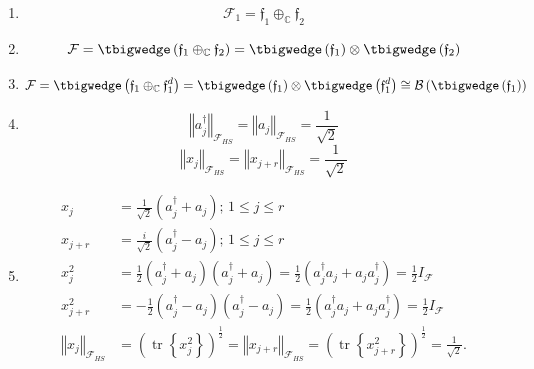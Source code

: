 \documentclass[aps, preprint]{revtex4}
\begin{document}
\begin{enumerate}
\item
\begin{equation}\mathcal{F}_{1} =\mathfrak{f}_{1}  \oplus _{\mathbb{C}}\mathfrak{f}_{2}
\end{equation}

\item
\begin{equation}\mathcal{F} = \tbigwedge \left (\mathfrak{f}_{1}  \oplus _{\mathbb{C}}\mathfrak{f}_{2}\right ) = \tbigwedge \left (\mathfrak{f}_{1}\right ) \otimes  \tbigwedge  \left (\mathfrak{f}_{2}\right )
\end{equation}

\item
\begin{equation}\mathcal{F} = \tbigwedge \left (\mathfrak{f}_{1}  \oplus _{\mathbb{C}}\mathfrak{f}_{1}^{d}\right ) = \tbigwedge \left (\mathfrak{f}_{1}\right ) \otimes  \tbigwedge  \left (\mathfrak{f}_{1}^{d}\right ) \cong \mathcal{B} \left ( \tbigwedge \left (\mathfrak{f}_{1}\right )\right )
\end{equation}

\item
\begin{equation}\left \Vert a_{j}^{ \dag }\right \Vert _{\mathcal{F}_{H S}} =\left \Vert a_{j}\right \Vert _{\mathcal{F}_{H S}} =\frac{1}{\sqrt{2}}
\end{equation}
\begin{equation}\left \Vert x_{j}\right \Vert _{\mathcal{F}_{H S}} =\left \Vert x_{j +r}\right \Vert _{\mathcal{F}_{H S}} =\frac{1}{\sqrt{2}}
\end{equation}

\item
\begin{align}x_{j} &  =\frac{1}{\sqrt{2}} \left (a_{j}^{ \dag } +a_{j}\right ) ;\,1 \leq j \leq r \\
x_{j +r} &  =\frac{i}{\sqrt{2}} \left (a_{j}^{ \dag } -a_{j}\right ) ;\,1 \leq j \leq r \\
x_{j}^{2} &  =\frac{1}{2} \left (a_{j}^{ \dag } +a_{j}\right ) \left (a_{j}^{ \dag } +a_{j}\right ) =\frac{1}{2} \left (a_{j}^{ \dag } a_{j} +a_{j} a_{j}^{ \dag }\right ) =\frac{1}{2} I_{\mathcal{F}} \\
x_{j +r}^{2} &  = -\frac{1}{2} \left (a_{j}^{ \dag } -a_{j}\right ) \left (a_{j}^{ \dag } -a_{j}\right ) =\frac{1}{2} \left (a_{j}^{ \dag } a_{j} +a_{j} a_{j}^{ \dag }\right ) =\frac{1}{2} I_{\mathcal{F}} \\
\left \Vert x_{j}\right \Vert _{\mathcal{F}_{H S}} &  =\left (\ensuremath{\operatorname*{tr}}\left \{x_{j}^{2}\right \}\right )^{\frac{1}{2}} =\left \Vert x_{j +r}\right \Vert _{\mathcal{F}_{H S}} =\left (\ensuremath{\operatorname*{tr}}\left \{x_{j +r}^{2}\right \}\right )^{\frac{1}{2}} =\frac{1}{\sqrt{2}}\text{.}\end{align}


\end{enumerate}
\end{document}
